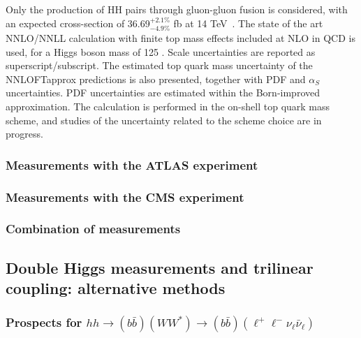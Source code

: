 \documentclass[../report.tex]{subfiles}
\providecommand{\main}{..}
\begin{document}
Only the production of HH pairs through gluon-gluon fusion is considered, with an expected cross-section of 36.69$^{+2.1\%}_{-4.9\%}$ fb at 14 TeV~\cite{Grazzini:2018bsd}. The state of the art NNLO/NNLL calculation with finite top mass effects included at NLO in QCD is used, for a Higgs boson mass of 125 \UGeV. Scale uncertainties are reported as superscript/subscript. The estimated top quark mass uncertainty of the NNLOFTapprox predictions is also presented, together with PDF and $\alpha_{S}$ uncertainties. PDF uncertainties are estimated within the Born-improved approximation. The calculation is performed in the on-shell top quark mass scheme, and studies of the uncertainty related to the scheme choice are in progress. 

\subsubsection{Measurements with the ATLAS experiment}
\label{sec:HH_ATLAS}



\subsubsection{Measurements with the CMS experiment}
\label{sec:HH_CMS}



\subsubsection{Combination of measurements}
\label{sec:HH_Combination}



\subsection{Double Higgs measurements and trilinear coupling: alternative methods}
\label{sec:HH_meas_th}

\subsubsection{Prospects for $hh \to (b \bar b)(WW^*) \to (b \bar b)( \ell^+\ell^- \nu_\ell \bar\nu_\ell)$}

\end{document}
